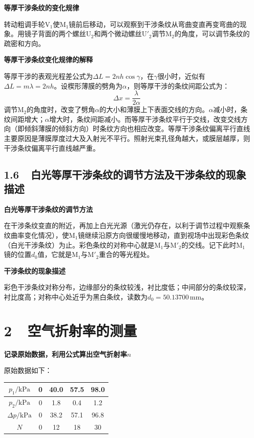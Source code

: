 \documentclass[a4paper,fontset=windows]{ctexart}
\begin{document}
    \textbf{等厚干涉条纹的变化规律}

    转动粗调手轮$\mathrm{V}_1$使$\mathrm{M}_1$镜前后移动，可以观察到干涉条纹从弯曲变直再变弯曲的现象。用镜子背面的两个螺丝$\mathrm{U}_2$和两个微动螺丝$\mathrm{U}'_2$调节$\mathrm{M}_2$的角度，可以调节条纹的疏密和方向。

    \textbf{等厚干涉条纹变化规律的解释}

    等厚干涉的表观光程差公式为$\Delta L = 2nh\cos\gamma$，在$\gamma$很小时，近似有$\Delta L = m\lambda = 2nh$。设楔形薄膜的劈角为$\alpha$，则等厚干涉的条纹间距公式为：
    \[
        \Delta x = \frac{\lambda}{2\alpha}
    \]
    调节$\mathrm{M}_2$的角度时，改变了劈角$\alpha$的大小和薄膜上下表面交线的方向。$\alpha$减小时，条纹间距增大；$\alpha$增大时，条纹间距减小。而等厚干涉条纹平行于交线，改变交线方向（即倾斜薄膜的倾斜方向）时条纹方向也相应改变。等厚干涉条纹偏离平行直线主要原因是薄膜厚度过大及入射光不平行。照射光束孔径角越大，或膜层越厚，则干涉条纹偏离平行直线越严重。


    \subsection*{1.6\ \ 白光等厚干涉条纹的调节方法及干涉条纹的现象描述}

    \textbf{白光等厚干涉条纹的调节方法}

    在干涉条纹变直的附近，再加上白光光源（激光仍存在，以利于调节过程中观察条纹曲率变化情况），使$\mathrm{M}_1$镜继续沿原方向很缓慢地移动，直到视场中出现彩色条纹（白光干涉条纹）为止。彩色条纹的对称中心就是$\mathrm{M}_1$与$\mathrm{M}'_2$的交线。记下此时$\mathrm{M}_1$镜的位置$d_0$值，它就是$\mathrm{M}_1$与$\mathrm{M}'_2$重合的等光程处。

    \textbf{干涉条纹的现象描述}

    彩色干涉条纹对称分布，边缘部分的条纹较浅，衬比度低；中间部分的条纹较深，衬比度高；对称中心处近乎为黑白条纹，读数为$d_0 = 50.13700\,\mathrm{mm}$。

    \section*{2\ \  空气折射率的测量}

    \textbf{记录原始数据，利用公式算出空气折射率$n$}

    原始数据如下：

    \begin{table}[h!]
        \begin{center}
            \begin{tabular}{|c|c|c|c|c|}
                \hline
                $p_1/\mathrm{kPa}$ & 0 & 40.0 & 57.5 & 98.0 \\
                \hline
                $p_2/\mathrm{kPa}$ & 0 & 1.8 & 0.4 & 1.2 \\
                \hline
                $\Delta p/\mathrm{kPa}$ & 0 & 38.2 & 57.1 & 96.8 \\
                \hline
                $N$ & 0 & 12 & 18 & 30 \\
                \hline
            \end{tabular}
        \end{center}
    \end{table}
\end{document}
